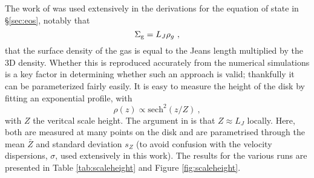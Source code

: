 The work of \citet{schaye2001} was used extensively in the derivations for the equation of state in \S \ref{sec:eos}, notably that
$$
    \Sigma_\mathrm{g} = L_J \rho_g~,
$$
that the surface density of the gas is equal to the Jeans length multiplied by the 3D density.
Whether this is reproduced accurately from the numerical simulations is a key factor in determining whether such an approach is valid; thankfully it can be parameterized fairly easily.
It is easy to measure the height of the disk by fitting an exponential profile, with
$$
    \rho(z) \propto \mathrm{sech}^2\left(z/Z\right)~,
$$
with $Z$ the veritcal scale height.
The argument in \citet{schaye2001} is that $Z \approx L_J$ locally.
Here, both are measured at many points on the disk and are parametrised through the mean $\bar{Z}$ and standard deviation $s_Z$ (to avoid confusion with the velocity dispersions, $\sigma$, used extensively in this work).
The results for the various runs are presented in Table \ref{tab:scaleheight} and Figure \ref{fig:scaleheight}.
